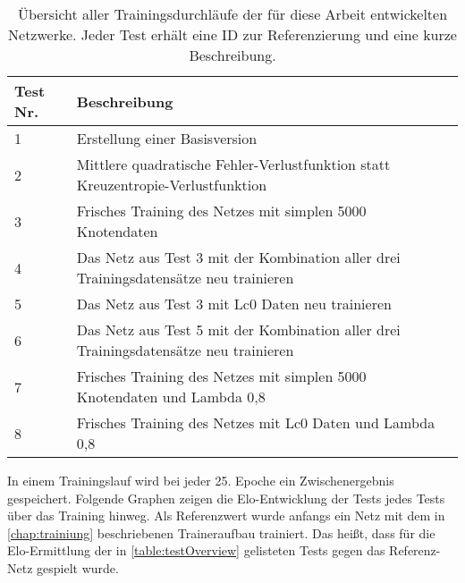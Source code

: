 \begin{table}[ht]
  \caption{Übersicht aller Trainingsdurchläufe der für diese Arbeit entwickelten Netzwerke. Jeder Test erhält eine ID zur Referenzierung und eine kurze Beschreibung.}
  \label{table:testOverview}
  \renewcommand{\arraystretch}{1.2}
  \centering
  \sffamily
  \begin{footnotesize}
    \begin{tabular}{l l}
      \toprule
      \textbf{Test Nr.} & \textbf{Beschreibung}                                                                 \\
      \midrule
      1                 & Erstellung einer Basisversion                                                         \\
      2                 & Mittlere quadratische Fehler-Verlustfunktion statt Kreuzentropie-Verlustfunktion      \\
      3                 & Frisches Training des Netzes mit simplen 5000 Knotendaten                             \\
      4                 & Das Netz aus Test 3 mit der Kombination aller drei Trainingsdatensätze neu trainieren \\
      5                 & Das Netz aus Test 3 mit \ac{Lc0} Daten neu trainieren                                 \\
      6                 & Das Netz aus Test 5 mit der Kombination aller drei Trainingsdatensätze neu trainieren \\
      7                 & Frisches Training des Netzes mit simplen 5000 Knotendaten und Lambda 0,8              \\
      8                 & Frisches Training des Netzes mit \ac{Lc0} Daten und Lambda 0,8                        \\
      \bottomrule
    \end{tabular}
  \end{footnotesize}
  \rmfamily
\end{table}

In einem Trainingslauf wird bei jeder 25. Epoche ein Zwischenergebnis gespeichert. Folgende Graphen zeigen die Elo-Entwicklung der Tests jedes Tests über das Training hinweg. Als Referenzwert wurde anfangs ein Netz mit dem in \autoref{chap:trainiung} beschriebenen Traineraufbau trainiert. Das heißt, dass für die Elo-Ermittlung der in \autoref{table:testOverview} gelisteten Tests gegen das Referenz-Netz gespielt wurde.

